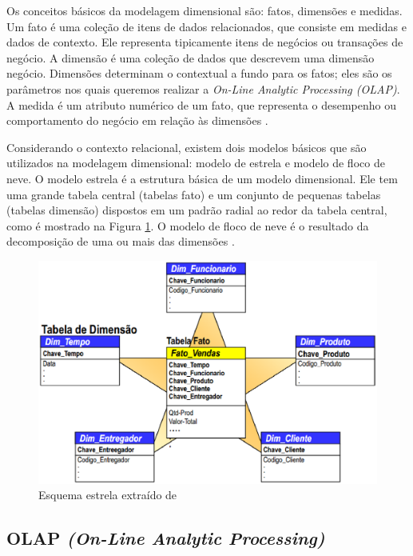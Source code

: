Os conceitos básicos da modelagem dimensional são: fatos, dimensões e medidas. Um fato é uma coleção de itens de dados relacionados, que consiste em medidas e dados de contexto. Ele representa tipicamente itens de negócios ou transações de negócio. A dimensão é uma coleção de dados que descrevem uma dimensão negócio. Dimensões determinam o contextual a fundo para os fatos; eles são os parâmetros nos quais queremos realizar a \textit{On-Line Analytic Processing (OLAP)}. A medida é um atributo numérico de um fato, que representa o desempenho ou comportamento do negócio em relação às dimensões \cite{marotta2000}.

Considerando o contexto relacional, existem dois modelos básicos que são utilizados na modelagem dimensional: modelo de estrela e modelo de floco de neve. O modelo estrela é a estrutura básica de um modelo dimensional. Ele tem uma grande tabela central (tabelas fato) e um conjunto de pequenas tabelas (tabelas dimensão) dispostos em um padrão radial 
ao redor da tabela central, como é mostrado na Figura \ref{fig:estrela}. O modelo de floco de neve é o resultado da decomposição de uma ou mais das dimensões \cite{marotta2000}.
 
\begin{figure}[h!]
\centering
\includegraphics[keepaspectratio=false,scale=0.6]{figuras/figuras_nilton/star.eps}
\caption{Esquema estrela extraído de }
\label{fig:estrela}
\end{figure}
\FloatBarrier
 
\subsection{OLAP \textit{(On-Line Analytic Processing)}}

